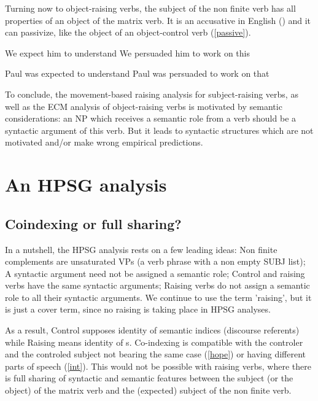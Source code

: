 \documentclass[output=paper]{langsci/langscibook}
\begin{document}
Turning now to object-raising verbs, the subject of the non finite verb has all properties of an object of the matrix verb. It is an accusative in English () and it can passivize, like the object of an object-control verb (\ref{passive}).

\begin{exe}
\ex
\begin{xlist}
\ex We expect him to understand
\ex  We persuaded him to work on this
\end{xlist}
\ex \begin{xlist} \label{passive}
\ex  Paul was expected to understand
\ex 	Paul was persuaded to work on that
\end{xlist}
	
\end{exe}

To conclude, the movement-based raising analysis for subject-raising verbs, as well as the ECM analysis of object-raising verbs is motivated by semantic considerations: an NP which receives a semantic role from a verb should be a syntactic argument of this verb. But it leads to syntactic structures which are not motivated and/or make wrong empirical predictions.
 


\section{An HPSG analysis}


\subsection{Coindexing or full sharing?}

In a nutshell, the HPSG analysis rests on a few leading ideas: Non finite complements are unsaturated VPs (a verb phrase with a non empty SUBJ list); A syntactic argument need not be assigned a semantic role; Control and raising verbs have the same syntactic arguments; Raising verbs do not assign a semantic role to all their syntactic arguments. We continue to use the term 'raising', but it is just a cover term, since no raising is taking place in HPSG analyses.

As a result, Control supposes identity of semantic indices (discourse referents) while Raising means identity of s. Co-indexing is compatible with the controler and the controled subject not bearing the same case (\ref{hope}) or having different parts of speech (\ref{int}). This would not be possible with raising verbs, where there is full sharing of syntactic and semantic features between the subject (or the object) of the matrix verb and the (expected) subject of the non finite verb.
\end{document}
